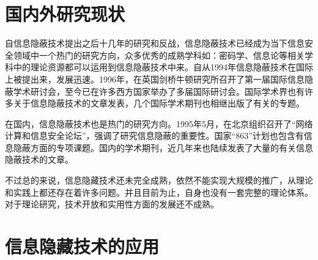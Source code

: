     \section{国内外研究现状}
    自信息隐蔽技术提出之后十几年的研究和反战，信息隐蔽技术已经成为当下信息安全领域中一个热门的研究方向，众多优秀的成熟学科如：密码学、信息论等相关学科中的理论资源都可以运用到信息隐蔽技术中来。自从1994年信息隐蔽技术在国际上被提出来，发展迅速。1996年，在英国剑桥牛顿研究所召开了第一届国际信息隐蔽学术研讨会，至今已在许多西方国家举办了多届国际研讨会。国际学术界也有许多关于信息隐蔽技术的文章发表，几个国际学术期刊也相继出版了有关的专题。
    \par 在国内，信息隐蔽技术也是热门的研究方向。1995年5月，在北京组织召开了“网络计算和信息安全论坛”，强调了研究信息隐蔽的重要性。国家“863”计划也包含有信息隐蔽方面的专项课题。国内的学术期刊，近几年来也陆续发表了大量的有关信息隐蔽技术的文章。
    \par 不过总的来说，信息隐藏技术还未完全成熟，依然不能实现大规模的推广，从理论和实践上都还存在着许多问题。并且目前为止，自身也没有一套完整的理论体系。对于理论研究，技术开放和实用性方面的发展还不成熟。
    \section{信息隐藏技术的应用}
